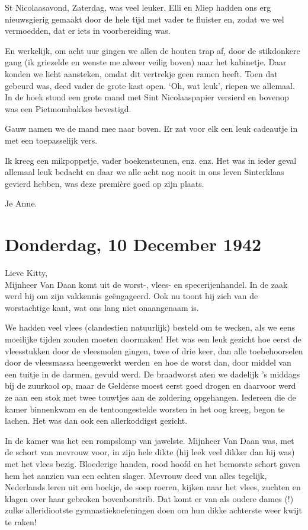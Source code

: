 \documentclass{book}
\begin{document}
St Nicolaasavond, Zaterdag, was veel leuker. Elli en Miep hadden ons erg
nieuwsgierig gemaakt door de hele tijd met vader te fluister en, zodat we wel
vermoedden, dat er iets in voorbereiding was.

En werkelijk, om acht uur gingen we allen de houten trap af, door de stikdonkere
gang (ik griezelde en wenste me alweer veilig boven) naar het kabinetje. Daar
konden we licht aansteken, omdat dit vertrekje geen ramen heeft. Toen dat
gebeurd was, deed vader de grote kast open. `Oh, wat leuk', riepen we allemaal.
In de hoek stond een grote mand met Sint Nicolaaspapier versierd en bovenop was
een Pietmombakkes bevestigd.

Gauw namen we de mand mee naar boven. Er zat voor elk een leuk cadeautje in met
een toepasselijk vers.

Ik kreeg een mikpoppetje, vader boekensteunen, enz. enz. Het was in ieder geval
allemaal leuk bedacht en daar we alle acht nog nooit in ons leven Sinterklaas
gevierd hebben, was deze première goed op zijn plaats.

Je Anne.

\section*{Donderdag, 10 December 1942}

Lieve Kitty,\\
Mijnheer Van Daan komt uit de worst-, vlees- en specerijenhandel.
In de zaak werd hij om zijn vakkennis geëngageerd. Ook nu toont hij zich van de
worstachtige kant, wat ons lang niet onaangenaam is.

We hadden veel vlees (clandestien natuurlijk) besteld om te wecken, als we eens
moeilijke tijden zouden moeten doormaken! Het was een leuk gezicht hoe eerst de
vleesstukken door de vleesmolen gingen, twee of drie keer, dan alle
toebehoorselen door de vleesmassa heengewerkt werden~en hoe de worst dan, door
middel van een tuitje in de darmen, gevuld werd. De braadworst aten we dadelijk
's middags bij de zuurkool op, maar de Gelderse moest eerst goed drogen en
daarvoor werd ze aan een stok met twee touwtjes aan de zoldering opgehangen.
Iedereen die de kamer binnenkwam en de tentoongestelde worsten in het oog kreeg,
begon te lachen. Het was dan ook een allerkoddigst gezicht.

In de kamer was het een rompslomp van jawelste. Mijnheer Van Daan was, met de
schort van mevrouw voor, in zijn hele dikte (hij leek veel dikker dan hij was)
met het vlees bezig. Bloederige handen, rood hoofd en het bemorste schort gaven
hem het aanzien van een echten slager. Mevrouw deed van alles tegelijk,
Nederlands leren uit een boekje, de soep roeren, kijken naar het vlees, zuchten
en klagen over haar gebroken bovenborstrib. Dat komt er van als oudere dames (!)
zulke alleridiootste gymnastiekoefeningen doen om hun dikke achterste weer kwijt
te raken!
\end{document}
